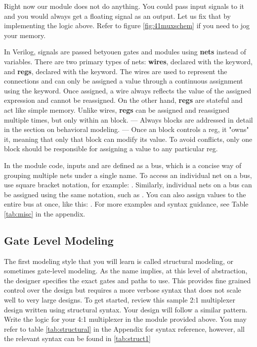 \documentclass[12pt]{labmanual}
\begin{document}
Right now our module does not do anything. You could pass input signals to it and you would always get a floating signal as an output. Let us fix that by implementing the logic above. Refer to figure \vref{fig:41muxschem} if you need to jog your memory.
\clearpage
\begin{extra}[frametitle={On nets: wires and regs}]
    In Verilog, signals are passed betyouen gates and modules using \textbf{nets} instead of variables. There are two primary types of nets: \textbf{wires}, declared with the  keyword, and \textbf{regs}, declared with the  keyword. The wires are used to represent the connections and can only be assigned a value through a continuous assignment using the  keyword. Once assigned, a wire always reflects the value of the assigned expression and cannot be reassigned. On the other hand, \textbf{regs} are stateful and act like simple memory. Unlike wires, \textbf{regs} can be assigned and reassigned multiple times, but only within an  block. --- Always blocks are addressed in detail in the section on behavioral modeling. --- Once an  block controls a reg, it "owns" it, meaning that only that block can modify its value. To avoid conflicts, only one  block should be responsible for assigning a value to any particular reg.
\end{extra}

\begin{extra}[frametitle={bus notation}]
    In the module code, inputs  and  are defined as a bus, which is a concise way of grouping multiple nets under a single name. To access an individual net on a bus, use square bracket notation, for example: . Similarly, individual nets on a bus can be assigned using the same notation, such as . You can also assign values to the entire bus at once, like this: . For more examples and syntax guidance, see Table \ref{tab:misc} in the appendix.
\end{extra}

\subsection{Gate Level Modeling}
The first modeling style that you will learn is called structural modeling, or sometimes gate-level modeling. As the name implies, at this level of abstraction, the designer specifies the exact gates and paths to use. This provides fine grained control over the design but requires a more verbose syntax that does not scale well to very large designs. To get started, review this sample 2:1 multiplexer design written using structural syntax. Your design will follow a similar pattern. Write the logic for your 4:1 multiplexer in the module provided above. You may refer to table \ref{tab:structural} in the Appendix for syntax reference, however, all the relevant syntax can be found in \ref{tab:struct1}
\end{document}
